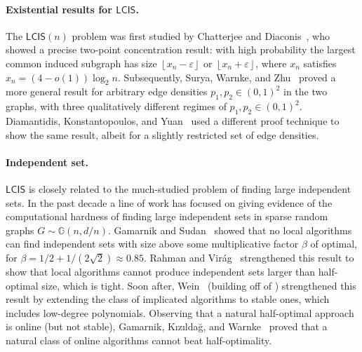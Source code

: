 \documentclass[11pt]{article}
\theoremstyle{plain}
\theoremstyle{definition}
\theoremstyle{remark}
\newcommand{\eps}{\varepsilon}
\newcommand{\MCS}{\mathsf{LCIS}}
\begin{document}
\paragraph{Existential results for $\MCS$.}
The $\MCS(n)$ problem was first studied by Chatterjee and Diaconis~\cite{CD23}, who showed a precise two-point concentration result: 
with high probability the largest common induced subgraph has size 
$\left\lfloor x_{n} - \eps \right\rfloor$ 
or 
$\left\lfloor x_{n} + \eps \right\rfloor$, 
where 
$x_{n}$ satisfies
$x_{n} = (4-o(1))\log_2 n$. 
Subsequently, Surya, Warnke, and Zhu~\cite{SWZ25} proved a more general result
for arbitrary edge densities $p_1, p_2 \in (0,1)^2$ in the two graphs, 
with three qualitatively different regimes of $p_1, p_2 \in (0,1)^2$. 
Diamantidis, Konstantopoulos, and Yuan~\cite{DKY25} used a different proof technique to show the same result, albeit for a slightly restricted set of edge densities.

\paragraph{Independent set.}
$\MCS$ is closely related to the much-studied problem of finding large independent sets. In the past decade a line of work has focused on giving evidence of the computational hardness of finding large independent sets in sparse random graphs $G \sim \mathbb{G}(n,d/n)$. Gamarnik and Sudan~\cite{GS17} showed that no local algorithms can find independent sets with size above some multiplicative factor $\beta$ of optimal, for $\beta = 1/2 + 1/(2\sqrt{2}) \approx 0.85$. Rahman and Vir\'ag~\cite{RV17} strengthened this result to show that local algorithms cannot produce independent sets larger than half-optimal size, which is tight. Soon after, Wein~\cite{Wei21} (building off of \cite{GJW24}) strengthened this result by extending the class of implicated algorithms to stable ones, which includes low-degree polynomials. Observing that a natural half-optimal approach \cite{grimmett1975colouring,Kar76} is online (but not stable), Gamarnik, K{\i}z{\i}lda\u{g}, and Warnke~\cite{GKW25} proved that a natural class of online algorithms cannot beat half-optimality. 
\end{document}
